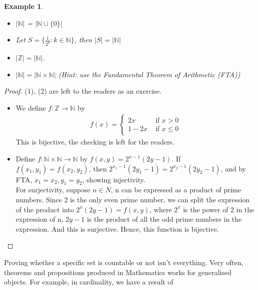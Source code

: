 \documentclass{book}
\newtheorem{example}[theorem]{Example}
\begin{document}
\begin{example} \label{Example 1.4.5}
    \begin{itemize}[itemsep = 0pt]
        \item[(1)] $|\mathbb{N}|$ = $|\mathbb{N} \cup \{0\}|$
        \item[(2)] Let $S = \{ \frac{1}{2^{k}} : k \in \mathbb{N} \}$, then $|S| = |\mathbb{N}|$
        \item[(3)] $|\mathbb{Z}| = |\mathbb{N}|$.
        \item[(4)] $|\mathbb{N}| = |\mathbb{N} \times \mathbb{N}|$ (Hint: use the Fundamental Theorem of Arithmetic (FTA))
    \end{itemize}
\end{example}

\begin{proof}
    (1), (2) are left to the readers as an exercise.
    \begin{itemize}[itemsep = 0pt]
        \item[(3)] We define $f : \mathbb{Z} \rightarrow \mathbb{N}$ by
        \begin{align*}
            f(x) = 
            \begin{cases}
                2x & \text{ if } x > 0 \\
                1 - 2x & \text{ if } x \leq 0
            \end{cases}
        \end{align*}
        This is bijective, the checking is left for the readers.
        \item[(4)] Define $f : \mathbb{N} \times \mathbb{N} \rightarrow \mathbb{N}$ by $f(x, y) = 2^{x - 1}(2y - 1)$. If $f(x_{1}, y_{1}) = f(x_{2}, y_{2})$, then $2^{x_{1} - 1}(2y_{1} - 1) = 2^{x_{2} - 1}(2y_{2} - 1)$, and by FTA, $x_{1} = x_{2}, y_{1} = y_{2}$, showing injectivity. \\
        For surjectivity, suppose $n \in N$, n can be expressed as a product of prime numbers. Since 2 is the only even prime number, we can split the expression of the product into $2^{x}(2y - 1) = f(x, y)$, where $2^{x}$ is the power of 2 in the expression of n, $2y - 1$ is the product of all the odd prime numbers in the expression. And this is surjective. Hence, this function is bijective.
    \end{itemize}
\end{proof}

Proving whether a specific set is countable or not isn't everything. Very often, theorems and propositions produced in Mathematics works for generalised objects. For example, in cardinality, we have a result of
\end{document}
